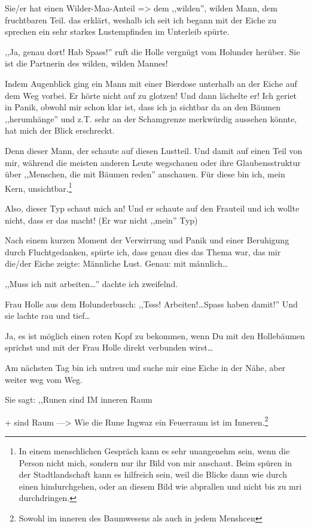 \documentclass[11pt,titlepage,a5paper]{book}
\begin{document}
Sie/er hat einen Wilder-Maa-Anteil => dem ,,wilden'', wilden Mann, dem fruchtbaren Teil. das erklärt, weshalb ich seit ich begann mit der Eiche zu sprechen ein sehr starkes Lustempfinden im Unterleib spürte. 

,,Ja, genau dort! Hab Spass!'' ruft die Holle vergnügt vom Holunder herüber. Sie ist die Partnerin des wilden, wilden Mannes!

Indem Augenblick ging ein Mann mit einer Bierdose unterhalb an der Eiche auf dem Weg vorbei. Er hörte nicht auf zu glotzen! Und dann lächelte er! Ich geriet in Panik, obwohl mir schon klar ist, dass ich ja sichtbar da an den Bäumen ,,herumhänge'' und z.T. sehr an der Schamgrenze merkwürdig aussehen könnte, hat mich der Blick erschreckt.

Denn dieser Mann, der schaute auf diesen Lustteil. Und damit auf einen Teil von mir, während die meisten anderen Leute wegschauen oder ihre Glaubensstruktur über ,,Menschen, die mit Bäumen reden'' anschauen. Für diese bin ich, mein Kern, unsichtbar.\footnote{In einem menschlichen Gespräch kann es sehr unangenehm sein, wenn die Person nicht mich, sondern nur ihr Bild von mir anschaut. Beim spüren in der Stadtlandschaft kann es hilfreich sein, weil die Blicke dann wie durch einen hindurchgehen, oder an diesem Bild wie abprallen und nicht bis zu mri durchdringen.}

Also, dieser Typ schaut mich an! Und er schaute auf den Frauteil und ich wollte nicht, dass er das macht! (Er war nicht ,,mein'' Typ)

Nach einem kurzen Moment der Verwirrung und Panik und einer Beruhigung durch Fluchtgedanken, spürte ich, dass genau dies das Thema war, das mir die/der Eiche zeigte: Männliche Lust. Genau: mit männlich\dots 

,,Muss ich mit arbeiten\dots '' dachte ich zweifelnd.

Frau Holle aus dem Holunderbusch: ,,Tsss! Arbeiten!\dots Spass haben damit!'' Und sie lachte rau und tief\dots

Ja, es ist möglich einen roten Kopf zu bekommen, wenn Du mit den Hollebäumen sprichst und mit der Frau Holle direkt verbunden wirst\dots

Am nächsten Tag bin ich untreu und suche mir eine Eiche in der Nähe, aber weiter weg vom Weg. 

Sie sagt: ,,Runen sind IM inneren Raum 

+ sind Raum  ---> Wie die Rune Ingwaz \textarc{[\withlines]\ng} ein Feuerraum ist im Inneren.\footnote{Sowohl im inneren des Baumwesens als auch in jedem Menshcen}
\end{document}
